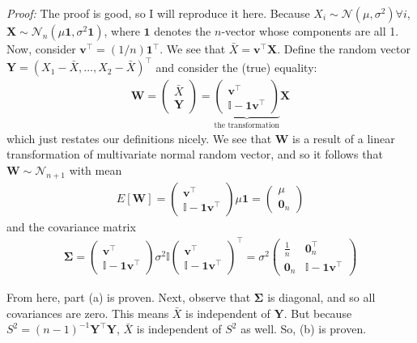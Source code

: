 \documentclass{book}
\theoremstyle{definition}
\newcommand{\N}{\mathcal{N}}
\newcommand{\X}{\mathbf{X}}
\newcommand{\f}[2]{\frac{#1}{#2}}
\newcommand{\lp}{\left(}
\newcommand{\rp}{\right)}
\newcommand{\Id}{\mathbb{I}}
\newcommand{\Y}{\mathbf{Y}}
\begin{document}
\noindent \textit{Proof:} The proof is good, so I will reproduce it here. Because $X_i \sim \N(\mu,\sigma^2) \forall i$, $\X \sim \N_n\lp \mu \mathbf{1}, \sigma^2\mathbf{1} \rp$, where $\mathbf{1}$ denotes the $n$-vector whose components are all 1. Now, consider $\mathbf{v}^\top = (1/n)\mathbf{1}^\top$. We see that $\bar{X} = \mathbf{v}^\top \X$. Define the random vector $\Y = (X_1 - \bar{X}, \dots, X_2 - \bar{X})^\top$ and consider the (true) equality:
\begin{align}
\mathbf{W} = \begin{pmatrix}
\bar{X} \\ \Y
\end{pmatrix} = \underbrace{\begin{pmatrix}
\mathbf{v}^\top \\ 
\Id - \mathbf{1}\mathbf{v}^\top
\end{pmatrix}}_{\text{the transformation}} \X
\end{align} 
which just restates our definitions nicely. We see that $\mathbf{W}$ is a result of a linear transformation of multivariate normal random vector, and so it follows that $\mathbf{W} \sim \N_{n+1}$ with mean 
\begin{align}
E[\mathbf{W}] = \begin{pmatrix}
\mathbf{v}^\top \\
\Id - \mathbf{1}\mathbf{v}^\top
\end{pmatrix}\mu \mathbf{1} = \begin{pmatrix}
\mu \\ \mathbf{0}_n
\end{pmatrix}
\end{align}
and the covariance matrix
\begin{align}
\mathbf{\Sigma} = \begin{pmatrix}
\mathbf{v}^\top \\
\Id - \mathbf{1}\mathbf{v}^\top
\end{pmatrix}\sigma^2 \Id
\begin{pmatrix}
\mathbf{v}^\top \\
\Id - \mathbf{1}\mathbf{v}^\top
\end{pmatrix}^\top = \sigma^2 \begin{pmatrix}
\f{1}{n} & \mathbf{0}_n^\top \\
\mathbf{0}_n & \Id - \mathbf{1}\mathbf{v}^\top
\end{pmatrix}
\end{align}

From here, part (a) is proven. Next, observe that $\mathbf{\Sigma}$ is diagonal, and so all covariances are zero. This means $\bar{X}$ is independent of $\mathbf{Y}$. But because $S^2 = (n-1)^{-1}\Y^\top \Y$, $\bar{X}$ is independent of $S^2$ as well. So, (b) is proven. \\
\end{document}
